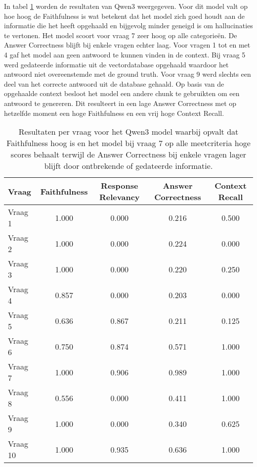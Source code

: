 In tabel \ref{tab:resultaten_vragen_qwen3} worden de resultaten van Qwen3 weergegeven. Voor dit model valt op hoe hoog de Faithfulness is wat betekent dat het model zich goed houdt aan de informatie die het heeft opgehaald en bijgevolg minder geneigd is om hallucinaties te vertonen. Het model scoort voor vraag 7 zeer hoog op alle categorieën. De Answer Correctness blijft bij enkele vragen echter laag. Voor vragen 1 tot en met 4 gaf het model aan geen antwoord te kunnen vinden in de context. Bij vraag 5 werd gedateerde informatie uit de vectordatabase opgehaald waardoor het antwoord niet overeenstemde met de ground truth. Voor vraag 9 werd slechts een deel van het correcte antwoord uit de database gehaald. Op basis van de opgehaalde context besloot het model een andere chunk te gebruikten om een antwoord te genereren. Dit resulteert in een lage Answer Correctness met op hetzelfde moment een hoge Faithfulness en een vrij hoge Context Recall.

\begin{table}[H]
    \begin{tabular}{|l|c|c|c|c|}
        \hline
        \textbf{Vraag} & \textbf{Faithfulness} & \textbf{Response Relevancy} & \textbf{Answer Correctness} & \textbf{Context Recall} \\
        \hline
        Vraag 1  & 1.000 & 0.000 & 0.216 & 0.500 \\
        Vraag 2  & 1.000 & 0.000 & 0.224 & 0.000 \\
        Vraag 3  & 1.000 & 0.000 & 0.220 & 0.250 \\
        Vraag 4  & 0.857 & 0.000 & 0.203 & 0.000 \\
        Vraag 5  & 0.636 & 0.867 & 0.211 & 0.125 \\
        Vraag 6  & 0.750 & 0.874 & 0.571 & 1.000 \\
        Vraag 7  & 1.000 & 0.906 & 0.989 & 1.000 \\
        Vraag 8  & 0.556 & 0.000 & 0.411 & 1.000 \\
        Vraag 9  & 1.000 & 0.000 & 0.340 & 0.625 \\
        Vraag 10 & 1.000 & 0.935 & 0.636 & 1.000 \\
        \hline
    \end{tabular}
    \caption{Resultaten per vraag voor het Qwen3 model waarbij opvalt dat Faithfulness hoog is en het model bij vraag 7 op alle meetcriteria hoge scores behaalt terwijl de Answer Correctness bij enkele vragen lager blijft door ontbrekende of gedateerde informatie.}
    \label{tab:resultaten_vragen_qwen3}
\end{table}


